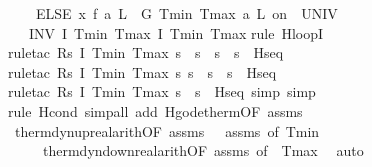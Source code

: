 \documentclass[envcountsame]{llncs}
\begin{document}
\begin{example}
\begin{isabellebody}
\ \ \ \ ELSE\ {\isacharparenleft}x{\isasymacute}{\isacharequal}\ f\ a\ L\ {\isacharampersand}\ G\ Tmin\ Tmax\ a\ L\ on\ {\isacharbraceleft}{}{\isachardot}{\isachardot}{\isasymtau}{\isacharbraceright}\ UNIV\ {\isacharat}\ {}{\isacharparenright}{\isacharparenright}\isanewline
\ \ {\isacharparenright}\ INV\ I\ Tmin\ Tmax{\isacharparenright}\ {\isasymlceil}I\ Tmin\ Tmax{\isasymrceil}{\isachardoublequoteclose}\isanewline
{}\isamarkupfalse%
{\isacharparenleft}rule\ H{\isacharunderscore}loopI{\isacharparenright}\isanewline
\ \ \ \ \isamarkupfalse%
{\isacharparenleft}rule{\isacharunderscore}tac\ R{\isacharequal}{\isachardoublequoteopen}{\isasymlambda}s{\isachardot}\ I\ Tmin\ Tmax\ s\ {\isasymand}\ s{\isachardollar}{}{\isacharequal}{}\ {\isasymand}\ s{\isachardollar}{}\ {\isacharequal}\ s{\isachardollar}{}{\isachardoublequoteclose}\ \ H{\isacharunderscore}seq{\isacharparenright}\isanewline
\ \ \ \ \ \isamarkupfalse%
{\isacharparenleft}rule{\isacharunderscore}tac\ R{\isacharequal}{\isachardoublequoteopen}{\isasymlambda}s{\isachardot}\ I\ Tmin\ Tmax\ s{\isasymand}\ s{\isachardollar}{}{\isacharequal}{}\ {\isasymand}\ s{\isachardollar}{}\ {\isacharequal}\ s{\isachardollar}{}{\isachardoublequoteclose}\ \ H{\isacharunderscore}seq{\isacharparenright}\isanewline
\ \ \ \ \ \ \isamarkupfalse%
{\isacharparenleft}rule{\isacharunderscore}tac\ R{\isacharequal}{\isachardoublequoteopen}{\isasymlambda}s{\isachardot}\ I\ Tmin\ Tmax\ s\ {\isasymand}\ s{\isachardollar}{}{\isacharequal}{}{\isachardoublequoteclose}\ \ H{\isacharunderscore}seq{\isacharcomma}\ simp{\isacharcomma}\ simp{\isacharparenright}\isanewline
\ \ \ \ \ \ \isamarkupfalse%
{\isacharparenleft}rule\ H{\isacharunderscore}cond{\isacharcomma}\ simp{\isacharunderscore}all\ add{\isacharcolon}\ H{\isacharunderscore}g{\isacharunderscore}ode{\isacharunderscore}therm{\isacharbrackleft}OF\ assms{\isacharparenleft}{}{\isacharcomma}{}{\isacharparenright}{\isacharbrackright}{\isacharparenright}{\isacharplus}\isanewline
\ \ \isamarkupfalse%
\ therm{\isacharunderscore}dyn{\isacharunderscore}up{\isacharunderscore}real{\isacharunderscore }arith{\isacharbrackleft}OF\ assms{\isacharparenleft}{}{\isacharparenright}\ {\isacharunderscore}\ {\isacharunderscore}\ assms{\isacharparenleft}{}{\isacharparenright}{\isacharcomma}\ of\ Tmin{\isacharbrackright}\isanewline
\ \ \ \ \ therm{\isacharunderscore}dyn{\isacharunderscore}down{\isacharunderscore }real{\isacharunderscore}arith{\isacharbrackleft}OF\ assms{\isacharparenleft}{}{\isacharcomma}{}{\isacharparenright}{\isacharcomma}\ of\ {\isacharunderscore}\ Tmax{\isacharbrackright}\ \isamarkupfalse%
\ auto\isanewline
\end{isabellebody}


\end{example}
\end{document}
